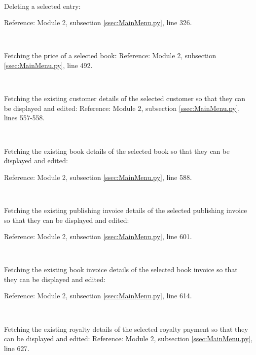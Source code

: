 \

Deleting a selected entry:
\begin{tiny}
\end{tiny}
Reference: Module 2,  subsection \ref{ssec:MainMenu.py}, line 326.

\

Fetching the price of a selected book:
Reference: Module 2,  subsection \ref{ssec:MainMenu.py}, line 492.

\

Fetching the existing customer details of the selected customer so that they can be displayed and edited:
Reference: Module 2,  subsection \ref{ssec:MainMenu.py}, lines 557-558.

\

Fetching the existing book details of the selected book so that they can be displayed and edited:
\begin{tiny}
\end{tiny}
Reference: Module 2,  subsection \ref{ssec:MainMenu.py}, line 588.

\

Fetching the existing publishing invoice details of the selected publishing invoice so that they can be displayed and edited:
\begin{tiny}
\end{tiny}
Reference: Module 2,  subsection \ref{ssec:MainMenu.py}, line 601.

\

Fetching the existing book invoice details of the selected book invoice so that they can be displayed and edited:
\begin{tiny}
\end{tiny}
Reference: Module 2,  subsection \ref{ssec:MainMenu.py}, line 614.

\

Fetching the existing royalty details of the selected royalty payment so that they can be displayed and edited:
Reference: Module 2,  subsection \ref{ssec:MainMenu.py}, line 627.

